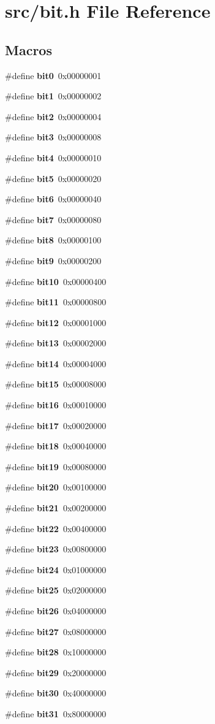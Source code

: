 \section{src/bit.h File Reference}
\label{bit_8h}
\subsection*{Macros}
\begin{DoxyCompactItemize}
\item 
\#define \textbf{ bit0}~0x00000001
\item 
\#define \textbf{ bit1}~0x00000002
\item 
\#define \textbf{ bit2}~0x00000004
\item 
\#define \textbf{ bit3}~0x00000008
\item 
\#define \textbf{ bit4}~0x00000010
\item 
\#define \textbf{ bit5}~0x00000020
\item 
\#define \textbf{ bit6}~0x00000040
\item 
\#define \textbf{ bit7}~0x00000080
\item 
\#define \textbf{ bit8}~0x00000100
\item 
\#define \textbf{ bit9}~0x00000200
\item 
\#define \textbf{ bit10}~0x00000400
\item 
\#define \textbf{ bit11}~0x00000800
\item 
\#define \textbf{ bit12}~0x00001000
\item 
\#define \textbf{ bit13}~0x00002000
\item 
\#define \textbf{ bit14}~0x00004000
\item 
\#define \textbf{ bit15}~0x00008000
\item 
\#define \textbf{ bit16}~0x00010000
\item 
\#define \textbf{ bit17}~0x00020000
\item 
\#define \textbf{ bit18}~0x00040000
\item 
\#define \textbf{ bit19}~0x00080000
\item 
\#define \textbf{ bit20}~0x00100000
\item 
\#define \textbf{ bit21}~0x00200000
\item 
\#define \textbf{ bit22}~0x00400000
\item 
\#define \textbf{ bit23}~0x00800000
\item 
\#define \textbf{ bit24}~0x01000000
\item 
\#define \textbf{ bit25}~0x02000000
\item 
\#define \textbf{ bit26}~0x04000000
\item 
\#define \textbf{ bit27}~0x08000000
\item 
\#define \textbf{ bit28}~0x10000000
\item 
\#define \textbf{ bit29}~0x20000000
\item 
\#define \textbf{ bit30}~0x40000000
\item 
\#define \textbf{ bit31}~0x80000000
\end{DoxyCompactItemize}


